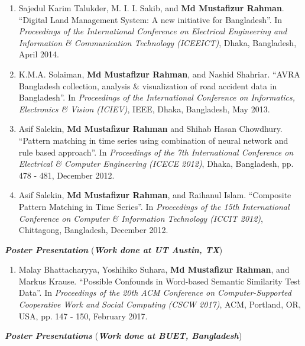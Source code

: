 \documentclass[11pt]{res}
\begin{document}
\begin{resume}
\begin{enumerate}
    \item Sajedul Karim Talukder, M. I. I. Sakib, and {\bf Md Mustafizur Rahman}. ``Digital Land Management System: A new initiative for Bangladesh''. In {\it Proceedings of the International Conference on Electrical Engineering and Information & Communication Technology (ICEEICT)}, Dhaka, Bangladesh, April 2014. %
    
    \item  K.M.A. Solaiman, {\bf Md Mustafizur Rahman}, and Nashid Shahriar.
    ``AVRA Bangladesh collection, analysis \& visualization of road accident
    data in Bangladesh''. In {\it Proceedings of the International Conference on Informatics, Electronics \& Vision (ICIEV)}, IEEE, Dhaka, Bangladesh, May 2013. %
    
    \item  Asif Salekin, {\bf Md Mustafizur Rahman} and Shihab Hasan Chowdhury.
    ``Pattern matching in time series using combination of neural  network and
    rule based approach''. In {\it Proceedings of the 7th International
    Conference  on  Electrical  \& Computer Engineering (ICECE 2012)},  Dhaka,
    Bangladesh, pp. 478 - 481, December 2012. %

    \item  Asif Salekin, {\bf Md Mustafizur Rahman}, and Raihanul Islam.
    ``Composite Pattern Matching in Time Series''. In {\it Proceedings of the
    15th International Conference on Computer \& Information Technology (ICCIT 2012)},
    Chittagong, Bangladesh, December 2012. %

    
\end{enumerate}   


\textbf{\textit{Poster Presentation}} ({\sl \textbf{Work done at UT Austin, TX}})
\begin{enumerate} \itemsep -2pt    

    \item Malay Bhattacharyya, Yoshihiko Suhara, \textbf{Md Mustafizur Rahman}, and Markus Krause. ``Possible Confounds in Word-based Semantic Similarity Test Data''. In {\it Proceedings of the 20th ACM Conference on Computer-Supported Cooperative Work and Social Computing (CSCW 2017)}, ACM, Portland, OR, USA, pp. 147 - 150, February 2017. %
\end{enumerate}
\textbf{\textit{Poster Presentations}} ({\sl \textbf{Work done at BUET, Bangladesh}})   


\end{resume}
\end{document}
